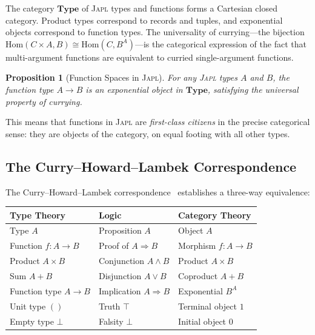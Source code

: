 \documentclass[11pt,a4paper]{article}
\newtheorem{proposition}[theorem]{Proposition}
\newcommand{\japl}{\textsc{Japl}}
\newcommand{\cat}[1]{\mathbf{#1}}
\newcommand{\Type}{\cat{Type}}
\newcommand{\Hom}{\mathrm{Hom}}
\begin{document}
The category $\Type$ of \japl{} types and functions forms a Cartesian closed category. Product types correspond to records and tuples, and exponential objects correspond to function types. The universality of currying---the bijection $\Hom(C \times A, B) \cong \Hom(C, B^A)$---is the categorical expression of the fact that multi-argument functions are equivalent to curried single-argument functions.

\begin{proposition}[Function Spaces in \japl{}]
\label{prop:function-spaces}
For any \japl{} types $A$ and $B$, the function type $A \to B$ is an exponential object in $\Type$, satisfying the universal property of currying.
\end{proposition}

This means that functions in \japl{} are \emph{first-class citizens} in the precise categorical sense: they are objects of the category, on equal footing with all other types.

\subsection{The Curry--Howard--Lambek Correspondence}

The Curry--Howard--Lambek correspondence~\citep{curry1958combinatory,howard1980formulae,lambek1980cartesian,lambek1986introduction} establishes a three-way equivalence:

\begin{center}
\begin{tabular}{lll}
\toprule
\textbf{Type Theory} & \textbf{Logic} & \textbf{Category Theory} \\
\midrule
Type $A$ & Proposition $A$ & Object $A$ \\
Function $f : A \to B$ & Proof of $A \Rightarrow B$ & Morphism $f : A \to B$ \\
Product $A \times B$ & Conjunction $A \land B$ & Product $A \times B$ \\
Sum $A + B$ & Disjunction $A \lor B$ & Coproduct $A + B$ \\
Function type $A \to B$ & Implication $A \Rightarrow B$ & Exponential $B^A$ \\
Unit type $()$ & Truth $\top$ & Terminal object $1$ \\
Empty type $\bot$ & Falsity $\bot$ & Initial object $0$ \\
\bottomrule
\end{tabular}
\end{center}
\end{document}
